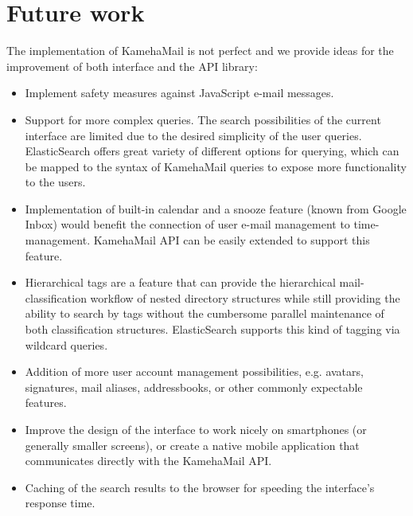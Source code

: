 \section{Future work}
The implementation of KamehaMail is not perfect and we provide ideas for the improvement of both interface and the API library:
\begin{itemize}
\item Implement safety measures against JavaScript e-mail messages.
\item Support for more complex queries. The search possibilities of the current interface are limited due to the desired simplicity of the user queries. ElasticSearch offers great variety of different options for querying, which can be mapped to the syntax of KamehaMail queries to expose more functionality to the users.
\item Implementation of built-in calendar and a snooze feature (known from Google Inbox) would benefit the connection of user e-mail management to time-management. KamehaMail API can be easily extended to support this feature.
\item Hierarchical tags are a feature that can provide the hierarchical mail-classification workflow of nested directory structures while still providing the ability to search by tags without the cumbersome parallel maintenance of both classification structures. ElasticSearch supports this kind of tagging via wildcard queries.
\item Addition of more user account management possibilities, e.g. avatars, signatures, mail aliases, addressbooks, or other commonly expectable features.
\item Improve the design of the interface to work nicely on smartphones (or generally smaller screens), or create a native mobile application that communicates directly with the KamehaMail API.
\item Caching of the search results to the browser for speeding the interface's response time.
\end{itemize} 
